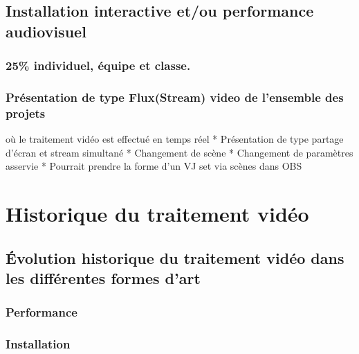 \documentclass[
]{book}
\begin{document}
\hypertarget{sommatif_6}{%
\section{Installation interactive et/ou performance audiovisuel}\label{sommatif_6}}

\hypertarget{individuel-uxe9quipe-et-classe.}{%
\subsection{25\% individuel, équipe et classe.}\label{individuel-uxe9quipe-et-classe.}}

\hypertarget{pruxe9sentation-de-type-fluxstream-video-de-lensemble-des-projets}{%
\subsection{Présentation de type Flux(Stream) video de l'ensemble des projets}\label{pruxe9sentation-de-type-fluxstream-video-de-lensemble-des-projets}}

où le traitement vidéo est effectué en temps réel
* Présentation de type partage d'écran et stream simultané
* Changement de scène
* Changement de paramètres asservie
* Pourrait prendre la forme d'un VJ set via scènes dans OBS

\hypertarget{historique}{%
\chapter{Historique du traitement vidéo}\label{historique}}

\hypertarget{evolution_historique}{%
\section{Évolution historique du traitement vidéo dans les différentes formes d'art}\label{evolution_historique}}

\hypertarget{evolution_historique_performance}{%
\subsection{Performance}\label{evolution_historique_performance}}

\hypertarget{evolution_historique_installation}{%
\subsection{Installation}\label{evolution_historique_installation}}
\end{document}
